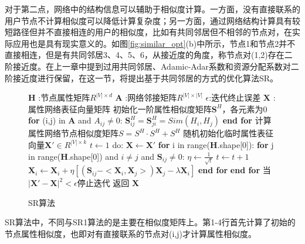 对于第二点，网络中的结构信息可以辅助于相似度计算。一方面，没有直接联系的用户节点不计算相似度可以降低计算复杂度；另一方面，通过网络结构计算具有较短路径但并不直接相连的用户的相似度，比如有共同邻居但不相邻的节点对，在实际应用也是具有现实意义的。如图\ref{fig:similar_opt}(b)中所示，节点1和节点2并不直接相连，但是有共同邻居3、4、5、6，从接近度的角度，称节点对(1,2)存在二阶接近度。在上一章中提到过用共同邻居、Adamic-Adar系数和资源分配系数对二阶接近度进行保留，在这一节，将提出基于共同邻居的方式的优化算法SR。

\begin{figure}[htb]
	\centering
	\begin{minipage}{.7\linewidth}
		\begin{algorithm}[H]
			\small
			\caption{SR算法}
			\begin{algorithmic}[1]
				\Require
				\Statex $\textbf{H}$ :节点属性矩阵$R^{|V|\times d}$
				\Statex $\textbf{A}$ :网络邻接矩阵$R^{|V|\times |V|}$ 
				\Statex $\epsilon$:迭代终止误差
				\Ensure
				\Statex $\textbf{X}$ :属性网络表征向量矩阵
				\Statex
				\State 初始化一阶属性相似度矩阵$\textbf{S}^{H}$，各元素为0
				\State \textbf{for} (i,j) in \textbf{A} and $A_{ij}\ne 0$:
				\State \quad $\textbf{S}^H_{ij} =\textbf{S}^H_{ji}=Sim(H_i, H_j)$
				\State \textbf{end for}
				\State 计算属性网络节点相似度矩阵$S = S^H\cdot S^H + S^H$
				\State 随机初始化临时属性表征向量$\textbf{X}'\in R^{|V|\times k}$
				\State $t \leftarrow 1$
				\State do:
				\State \quad $\textbf{X}\leftarrow\textbf{X}'$
				\State\quad \textbf{for} i in range(\textbf{H}.shape[0]):
				\State\qquad \textbf{for} j in range(\textbf{H}.shape[0]) and $i\ne j$ and $\textbf{S}_{ij}\ne0$:
				\State\quad \qquad $\eta \leftarrow \frac{1}{\sqrt{t}}$
				\State\quad \qquad $t\leftarrow t+1$
				\State\quad \qquad $\textbf{X}_i \leftarrow \textbf{X}_i + \eta [(\textbf{S}_{ij}-<\textbf{X}_i, \textbf{X}_j>)\textbf{X}_j - \lambda \textbf{X}_i]$
				\State \qquad \textbf{end for}
				\State \quad \textbf{end for}
				\State 当$|\textbf{X}'-\textbf{X}|^2<\epsilon$停止迭代
				\State 返回 $\textbf{X}$
			\end{algorithmic}
		\end{algorithm}
	\end{minipage}
\end{figure}

SR算法中，不同与SR1算法的是主要在相似度矩阵上。第1-4行首先计算了初始的节点属性相似度，也即对有直接联系的节点对(i,j)才计算属性相似度。

